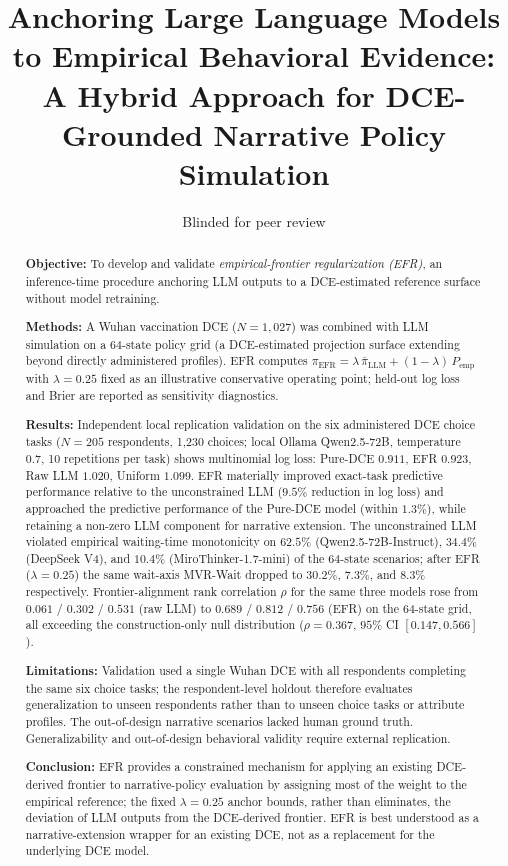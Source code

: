 \documentclass[11pt]{article}
\title{Anchoring Large Language Models to Empirical Behavioral Evidence: A Hybrid Approach for DCE-Grounded Narrative Policy Simulation}
\author{Blinded for peer review}
\date{}
\begin{document}
\maketitle


\begin{abstract}
\textbf{Objective:} To develop and validate \emph{empirical-frontier regularization (EFR)}, an inference-time procedure anchoring LLM outputs to a DCE-estimated reference surface without model retraining.

\textbf{Methods:} A Wuhan vaccination DCE ($N\!=\!1{,}027$) was combined with LLM simulation on a 64-state policy grid (a DCE-estimated projection surface extending beyond directly administered profiles). EFR computes $\pi_{\text{EFR}} = \lambda\,\bar\pi_{\text{LLM}} + (1-\lambda)\,P_{\text{emp}}$ with $\lambda\!=\!0.25$ fixed as an illustrative conservative operating point; held-out log loss and Brier are reported as sensitivity diagnostics.

\textbf{Results:} Independent local replication validation on the six administered DCE choice tasks ($N=205$ respondents, 1,230 choices; local Ollama Qwen2.5-72B, temperature 0.7, 10 repetitions per task) shows multinomial log loss: Pure-DCE $0.911$, EFR $0.923$, Raw LLM $1.020$, Uniform $1.099$. EFR materially improved exact-task predictive performance relative to the unconstrained LLM ($9.5\%$ reduction in log loss) and approached the predictive performance of the Pure-DCE model (within $1.3\%$), while retaining a non-zero LLM component for narrative extension. The unconstrained LLM violated empirical waiting-time monotonicity on $62.5\%$ (Qwen2.5-72B-Instruct), $34.4\%$ (DeepSeek V4), and $10.4\%$ (MiroThinker-1.7-mini) of the 64-state scenarios; after EFR ($\lambda = 0.25$) the same wait-axis MVR-Wait dropped to $30.2\%$, $7.3\%$, and $8.3\%$ respectively. Frontier-alignment rank correlation $\rho$ for the same three models rose from $0.061$ / $0.302$ / $0.531$ (raw LLM) to $0.689$ / $0.812$ / $0.756$ (EFR) on the 64-state grid, all exceeding the construction-only null distribution ($\rho\!=\!0.367$, $95\%$ CI $[0.147, 0.566]$).

\textbf{Limitations:} Validation used a single Wuhan DCE with all respondents completing the same six choice tasks; the respondent-level holdout therefore evaluates generalization to unseen respondents rather than to unseen choice tasks or attribute profiles. The out-of-design narrative scenarios lacked human ground truth. Generalizability and out-of-design behavioral validity require external replication.

\textbf{Conclusion:} EFR provides a constrained mechanism for applying an existing DCE-derived frontier to narrative-policy evaluation by assigning most of the weight to the empirical reference; the fixed $\lambda\!=\!0.25$ anchor bounds, rather than eliminates, the deviation of LLM outputs from the DCE-derived frontier. EFR is best understood as a narrative-extension wrapper for an existing DCE, not as a replacement for the underlying DCE model.
\end{abstract}
\end{document}
